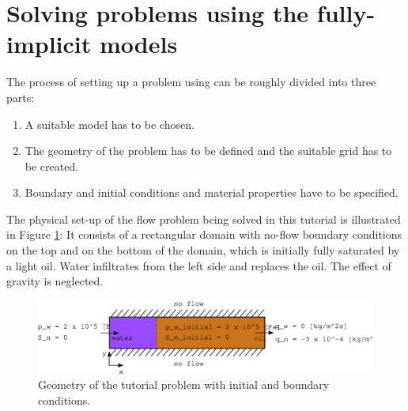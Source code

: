 \section{Solving problems using the fully-implicit models}
\label{tutorial-coupled}

The process of setting up a problem using \eWoms can be roughly
divided into three parts:
\begin{enumerate}
\item A suitable model has to be chosen.
\item The geometry of the problem has to be defined and the suitable
  grid has to be created.
\item Boundary and initial conditions and material properties have to
  be specified.
\end{enumerate}

The physical set-up of the flow problem being solved in this tutorial
is illustrated in Figure \ref{tutorial-coupled:problemfigure}: It
consists of a rectangular domain with no-flow boundary conditions on
the top and on the bottom of the domain, which is initially fully
saturated by a light oil. Water infiltrates from the left side and
replaces the oil. The effect of gravity is neglected.

\begin{figure}[ht]
\centering
\includegraphics[width=0.9\linewidth,keepaspectratio]{EPS/tutorial-problemconfiguration}
\caption{Geometry of the tutorial problem with initial and boundary conditions.}\label{tutorial-coupled:problemfigure}
\end{figure}

